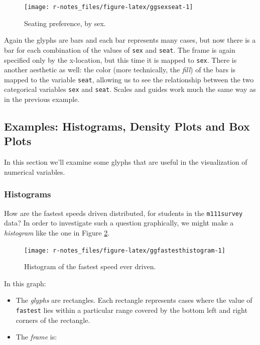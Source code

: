 \documentclass[]{book}
\providecommand{\tightlist}{%
  \setlength{\itemsep}{0pt}\setlength{\parskip}{0pt}}
\theoremstyle{definition}
\theoremstyle{definition}
\theoremstyle{definition}
\theoremstyle{remark}
\begin{document}
{\begin{figure}
{\centering \texttt{[image: r-notes\_files/figure-latex/ggsexseat-1]} 

}

\caption{Seating preference, by sex.}\label{fig:ggsexseat}
\end{figure}

Again the glyphs are bars and each bar represents many cases, but now
there is a bar for each combination of the values of \texttt{sex} and
\texttt{seat}. The frame is again specified only by the x-location, but
this time it is mapped to \texttt{sex}. There is another aesthetic as
well: the color (more technically, the \emph{fill}) of the bars is
mapped to the variable \texttt{seat}, allowing us to see the
relationship between the two categorical variables \texttt{sex} and
\texttt{seat}. Scales and guides work much the same way as in the
previous example.

\subsection{Examples: Histograms, Density Plots and Box
Plots}\label{examples-histograms-density-plots-and-box-plots}

In this section we'll examine some glyphs that are useful in the
visualization of numerical variables.

\subsubsection{Histograms}\label{histograms}

How are the fastest speeds driven distributed, for students in the
\texttt{m111survey} data? In order to investigate such a question
graphically, we might make a \emph{histogram} like the one in Figure
\ref{fig:ggfastesthistogram}.

\begin{figure}

{\centering \texttt{[image: r-notes\_files/figure-latex/ggfastesthistogram-1]} 

}

\caption{Histogram of the fastest speed ever driven.}\label{fig:ggfastesthistogram}
\end{figure}

In this graph:

\begin{itemize}
\tightlist
\item
  The \emph{glyphs} are rectangles. Each rectangle represents cases
  where the value of \texttt{fastest} lies within a particular range
  covered by the bottom left and right corners of the rectangle.
\item
  The \emph{frame} is:


\end{itemize}}
\end{document}
